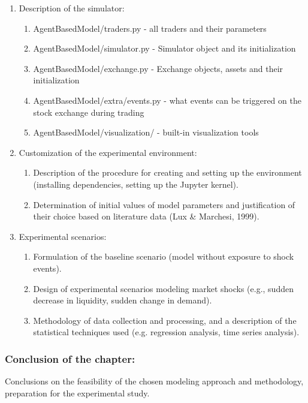 \begin{enumerate}
    \item Description of the simulator:
    \begin{enumerate}
        \item AgentBasedModel/traders.py - all traders and their parameters
        \item AgentBasedModel/simulator.py - Simulator object and its initialization
        \item AgentBasedModel/exchange.py - Exchange objects, assets and their initialization
        \item AgentBasedModel/extra/events.py - what events can be triggered on the stock exchange during trading
        \item AgentBasedModel/visualization/ - built-in visualization tools
    \end{enumerate}
    \item Customization of the experimental environment:
    \begin{enumerate}
        \item Description of the procedure for creating and setting up the environment (installing dependencies, setting up the Jupyter kernel).
        \item Determination of initial values of model parameters and justification of their choice based on literature data (Lux & Marchesi, 1999).
    \end{enumerate}
    \item Experimental scenarios:
    \begin{enumerate}
        \item Formulation of the baseline scenario (model without exposure to shock events).
        \item Design of experimental scenarios modeling market shocks (e.g., sudden decrease in liquidity, sudden change in demand).
        \item Methodology of data collection and processing, and a description of the statistical techniques used (e.g. regression analysis, time series analysis).
    \end{enumerate}
\end{enumerate}

\subsubsection{Conclusion of the chapter:}

Conclusions on the feasibility of the chosen modeling approach and methodology, preparation for the experimental study.

